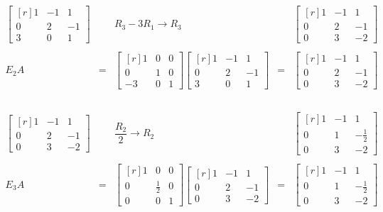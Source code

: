\begin{enumerate}
    $$\begin{array}{rcccc}
	\begin{bmatrix*}[r]
	    1 & -1 & 1\\
	    0 & 2 & -1\\
	    3 & 0 & 1
	\end{bmatrix*} && R_3-3R_1\to R_3 & &
	\begin{bmatrix*}[r]
	    1 & -1 & 1\\
	    0 & 2 & -1\\
	    0 & 3 & -2
	\end{bmatrix*} \\\\
	E_2A&=&\begin{bmatrix*}[r]
	    1 & 0 & 0\\
	    0 & 1 & 0\\
	    -3 & 0 & 1
	\end{bmatrix*} 
	\begin{bmatrix*}[r]
	    1 & -1 & 1\\
	    0 & 2 & -1\\
	    3 & 0 & 1
	\end{bmatrix*} &=& 
	\begin{bmatrix*}[r]
	    1 & -1 & 1\\
	    0 & 2 & -1\\
	    0 & 3 & -2
	\end{bmatrix*} \\\\
    \end{array}$$

    $$\begin{array}{rcccc}
	\begin{bmatrix*}[r]
	    1 & -1 & 1\\
	    0 & 2 & -1\\
	    0 & 3 & -2
	\end{bmatrix*} && \dfrac{R_2}{2} \to R_2 & &
	\begin{bmatrix*}[r]
	    1 & -1 & 1\\
	    0 & 1 & -\frac{1}{2}\\
	    0 & 3 & -2
	\end{bmatrix*} \\\\
	E_3A&=&\begin{bmatrix*}[r]
	    1 & 0 & 0\\
	    0 & \frac{1}{2} & 0\\
	    0 & 0 & 1
	\end{bmatrix*} 
	\begin{bmatrix*}[r]
	    1 & -1 & 1\\
	    0 & 2 & -1\\
	    0 & 3 & -2
	\end{bmatrix*} &=& 
	\begin{bmatrix*}[r]
	    1 & -1 & 1\\
	    0 & 1 & -\frac{1}{2}\\
	    0 & 3 & -2
	\end{bmatrix*} \\\\
    \end{array}$$


\end{enumerate}
